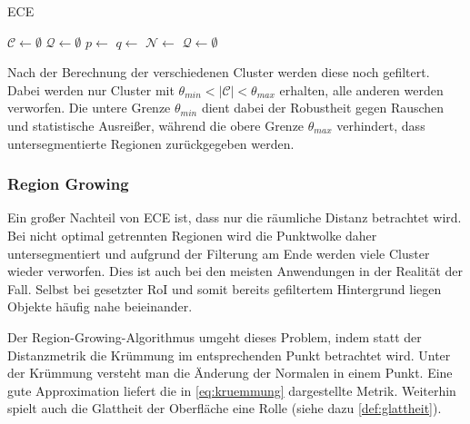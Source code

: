 \begin{algorithm}[H]
\caption[\acl{ECE}]{\acl{ECE} \cite[89--90]{RusuDoctoralDissertation}}
\label{alg:euclidean-cluster-extraction}
\begin{algorithmic}
\State $\mathcal{C} \gets \emptyset$
\State $\mathcal{Q} \gets \emptyset$
	\State $p \gets$ 
	\State {}
		\State $q \gets$ 
		\State $\mathcal{N} \gets$ 
		\State {}
		\State {}
	\EndWhile
	\State {}
	\State $\mathcal{Q} \gets \emptyset$
\EndWhile
\State {}
\end{algorithmic}
\end{algorithm}

Nach der Berechnung der verschiedenen Cluster werden diese noch gefiltert.
Dabei werden nur Cluster mit $\theta_{min} < |\mathcal{C}| < \theta_{max}$ erhalten, alle anderen werden verworfen.
Die untere Grenze $\theta_{min}$ dient dabei der Robustheit gegen Rauschen und statistische Ausreißer, während die obere Grenze $\theta_{max}$ verhindert, dass untersegmentierte Regionen zurückgegeben werden.

\subsubsection{Region Growing}
\label{subsubsec:region-growing}

Ein großer Nachteil von \ac{ECE} ist, dass nur die räumliche Distanz betrachtet wird.
Bei nicht optimal getrennten Regionen wird die Punktwolke daher untersegmentiert und aufgrund der Filterung am Ende werden viele Cluster wieder verworfen.
Dies ist auch bei den meisten Anwendungen in der Realität der Fall.
Selbst bei gesetzter \ac{RoI} und somit bereits gefiltertem Hintergrund liegen Objekte häufig nahe beieinander.

Der Region-Growing-Algorithmus umgeht dieses Problem, indem statt der Distanzmetrik die Krümmung im entsprechenden Punkt betrachtet wird.
Unter der Krümmung versteht man die Änderung der Normalen in einem Punkt.
Eine gute Approximation liefert die in \autoref{eq:kruemmung} dargestellte Metrik.
Weiterhin spielt auch die Glattheit der Oberfläche eine Rolle (siehe dazu \autoref{def:glattheit}).

